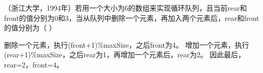 \question （浙江大学，1994年）若用一个大小为6的数组来实现循环队列，且当前rear和front的值分别为0和3，当从队列中删除一个元素，再加入两个元素后，rear和front的值分别为（
）
\par{}
\begin{solution}删除一个元素，执行(front+1)\%maxSize，之后front为4。
增加一个元素，执行(rear+1)\%maxSize，之后rear为1，再增加一个元素后，rear为2。
因此最后，rear=2，front=4。
\end{solution}
